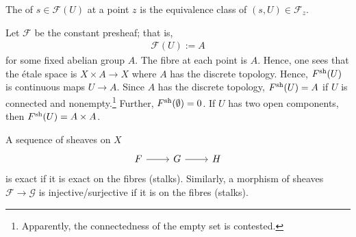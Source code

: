 \documentclass [11 pt, oneside] {article}
\begin{document}
\begin{definition}[ ]\label{}\text{}
The  of $s\in \mathscr{F}(U)$ at a point $z$ is the equivalence class of $(s,U) \in  \mathscr{F}_z$.
\end{definition}

\begin{example}[Sheafification]\label{}\text{}
Let $\mathscr{F}$ be the constant presheaf; that is,
\begin{align*}
	\mathscr{F}(U) := A
\end{align*}
for some fixed abelian group $A$. The fibre at each point is $A$. Hence, one sees that the \'etale space is $X\times A \longrightarrow X$ where $A$ has the discrete topology. Hence, $\relax{F}^{\textup {sh}}(U)$ is continuous maps $U\longrightarrow A$. Since $A$ has the discrete topology, $\relax{F}^{\textup {sh}}(U)=A$ if $U$ is connected and nonempty.\footnote{Apparently, the connectedness of the empty set is contested.} Further, $\relax{F}^{\textup {sh}}(\emptyset ) = 0$. If $U$ has two open components, then $\relax{F}^{\textup {sh}}(U) = A\times A$. 
\end{example}

A sequence of sheaves on $X$
\[
\begin{tikzcd}
	\mathscr{F} \ar[r] &\mathscr{G}\ar[r] &\mathscr{H}
\end{tikzcd}
\]
is exact if it is exact on the fibres (stalks). Similarly, a morphism of sheaves $\mathscr{F}\longrightarrow \mathscr{G}$ is injective/surjective if it is on the fibres (stalks).
\end{document}
